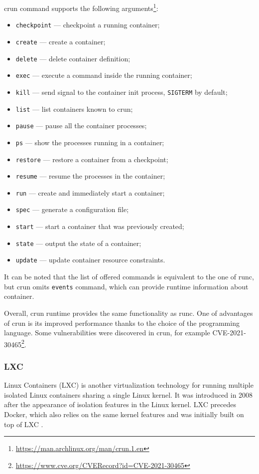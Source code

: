 crun command supports the following arguments\footnote{\url{https://man.archlinux.org/man/crun.1.en}}:
\begin{itemize}
  \item \texttt{checkpoint} — checkpoint a running container;
  \item \texttt{create} — create a container;
  \item \texttt{delete} — delete container definition;
  \item \texttt{exec} — execute a command inside the running container;
  \item \texttt{kill} — send signal to the container init process, \texttt{SIGTERM} by default;
  \item \texttt{list} — list containers known to crun;
  \item \texttt{pause} — pause all the container processes;
  \item \texttt{ps} — show the processes running in a container;
  \item \texttt{restore} — restore a container from a checkpoint;
  \item \texttt{resume} — resume the processes in the container;
  \item \texttt{run} — create and immediately start a container;
  \item \texttt{spec} — generate a configuration file;
  \item \texttt{start} — start a container that was previously created;
  \item \texttt{state} — output the state of a container;
  \item \texttt{update} — update container resource constraints.
\end{itemize}

It can be noted that the list of offered commands is equivalent to the one of runc, but crun omits \texttt{events} command, which can provide runtime information about container.

Overall, crun runtime provides the same functionality as runc. One of advantages of crun is its improved performance thanks to the choice of the programming language. Some vulnerabilities were discovered in crun, for example CVE-2021-30465\footnote{\url{https://www.cve.org/CVERecord?id=CVE-2021-30465}}.

\subsubsection*{LXC}

Linux Containers (LXC) is another virtualization technology for running multiple isolated Linux containers sharing a single Linux kernel. It was introduced in 2008 after the appearance of isolation features in the Linux kernel. LXC precedes Docker, which also relies on the same kernel features and was initially built on top of LXC \cite{acm:1}.

